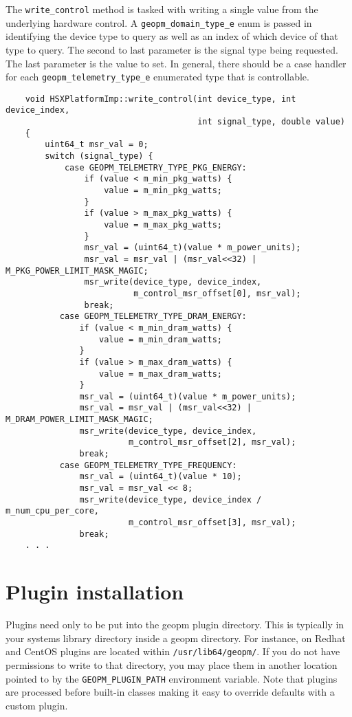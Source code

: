 \documentclass[11pt]{article}
\begin{document}
The \verb#write_control# method is tasked with writing a single value
from the underlying hardware control. A \verb#geopm_domain_type_e#
enum is passed in identifying the device type to query as well as an
index of which device of that type to query. The second to last
parameter is the signal type being requested. The last parameter is
the value to set. In general, there should be a case handler for each
\verb#geopm_telemetry_type_e# enumerated type that is controllable.
\begin{verbatim}
    void HSXPlatformImp::write_control(int device_type, int device_index,
                                       int signal_type, double value)
    {
        uint64_t msr_val = 0;
        switch (signal_type) {
            case GEOPM_TELEMETRY_TYPE_PKG_ENERGY:
                if (value < m_min_pkg_watts) {
                    value = m_min_pkg_watts;
                }
                if (value > m_max_pkg_watts) {
                    value = m_max_pkg_watts;
                }
                msr_val = (uint64_t)(value * m_power_units);
                msr_val = msr_val | (msr_val<<32) | M_PKG_POWER_LIMIT_MASK_MAGIC;
                msr_write(device_type, device_index,
                          m_control_msr_offset[0], msr_val);
                break;
           case GEOPM_TELEMETRY_TYPE_DRAM_ENERGY:
               if (value < m_min_dram_watts) {
                   value = m_min_dram_watts;
               }
               if (value > m_max_dram_watts) {
                   value = m_max_dram_watts;
               }
               msr_val = (uint64_t)(value * m_power_units);
               msr_val = msr_val | (msr_val<<32) | M_DRAM_POWER_LIMIT_MASK_MAGIC;
               msr_write(device_type, device_index,
                         m_control_msr_offset[2], msr_val);
               break;
           case GEOPM_TELEMETRY_TYPE_FREQUENCY:
               msr_val = (uint64_t)(value * 10);
               msr_val = msr_val << 8;
               msr_write(device_type, device_index / m_num_cpu_per_core,
                         m_control_msr_offset[3], msr_val);
               break;
    . . .
\end{verbatim}

\section{Plugin installation}
Plugins need only to be put into the geopm plugin directory. This is
typically in your systems library directory inside a geopm
directory. For instance, on Redhat and CentOS plugins are located
within \verb#/usr/lib64/geopm/#. If you do not have permissions to
write to that directory, you may place them in another location
pointed to by the \verb#GEOPM_PLUGIN_PATH# environment variable.  Note
that plugins are processed before built-in classes making it easy to
override defaults with a custom plugin.
\end{document}
